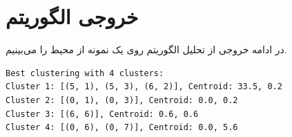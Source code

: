 \documentclass[11pt, a4paper, oneside]{report}
\begin{document}
	
	
	
	
\section{خروجی الگوریتم}
در ادامه خروجی از تحلیل الگوریتم روی یک نمونه از محیط را می‌بینیم.





 \begin{LTR}
	\begin{verbatim}
Best clustering with 4 clusters:
Cluster 1: [(5, 1), (5, 3), (6, 2)], Centroid: 33.5, 0.2
Cluster 2: [(0, 1), (0, 3)], Centroid: 0.0, 0.2
Cluster 3: [(6, 6)], Centroid: 0.6, 0.6
Cluster 4: [(0, 6), (0, 7)], Centroid: 0.0, 5.6
	\end{verbatim}
\end{LTR}
\end{document}
